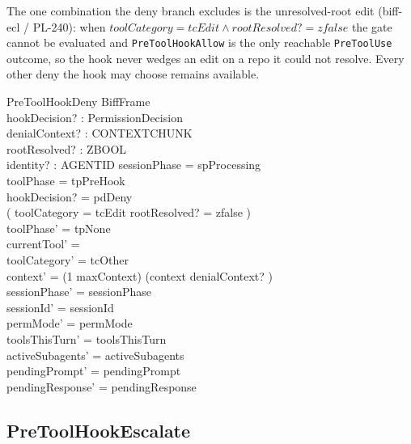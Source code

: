 \documentclass[a4paper,10pt,fleqn]{article}
\begin{document}
The one combination the deny branch excludes is the unresolved-root edit
(biff-ecl / PL-240): when $toolCategory = tcEdit \land rootResolved? =
zfalse$ the gate cannot be evaluated and \texttt{PreToolHookAllow} is the
only reachable \texttt{PreToolUse} outcome, so the hook never wedges an
edit on a repo it could not resolve. Every other deny the hook may choose
remains available.

\begin{schema}{PreToolHookDeny}
  BiffFrame \\
  hookDecision? : PermissionDecision \\
  denialContext? : CONTEXTCHUNK \\
  rootResolved? : ZBOOL \\
  identity? : AGENTID
  \where
  sessionPhase = spProcessing \\
  toolPhase = tpPreHook \\
  hookDecision? = pdDeny \\
  \lnot ( toolCategory = tcEdit \land rootResolved? = zfalse ) \\
  toolPhase' = tpNone \\
  currentTool' = \emptyset \\
  toolCategory' = tcOther \\
  context' = (1 \upto maxContext) \dres (context \cat \langle denialContext? \rangle) \\
  sessionPhase' = sessionPhase \\
  sessionId' = sessionId \\
  permMode' = permMode \\
  toolsThisTurn' = toolsThisTurn \\
  activeSubagents' = activeSubagents \\
  pendingPrompt' = pendingPrompt \\
  pendingResponse' = pendingResponse
\end{schema}

\subsection{PreToolHookEscalate}
\end{document}
